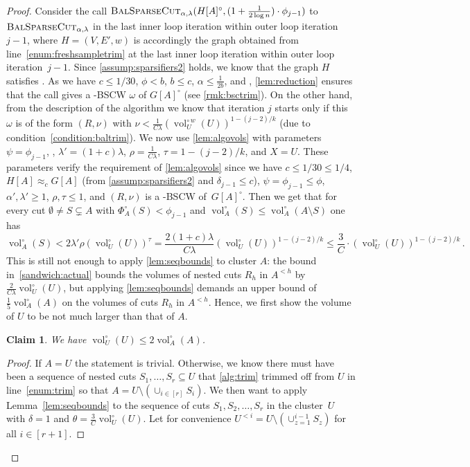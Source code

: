 \documentclass[epsfig,letter,11pt]{article}
\numberwithin{equation}{section}
\newcommand{\unvolc}[2]{\operatorname{vol}_{#2}^\circ (#1)}
\newcommand{\wvolc}[2]{\operatorname{vol}_{#2}^{\circ \,w} (#1)}
\newcommand{\unspc}[2]{\Phi_{#2}^\circ (#1)}
\newcommand{\bsc}{\textsc{BalSparseCut}_{\alpha,\lambda}}
\newtheorem{claim}[theorem]{Claim}
\begin{document}
\begin{proof}
	Consider the call $\bsc(H[A]^\circ, (1+\frac{1}{2\log n}) \cdot \phi_{j-1})$ to $\bsc$ in the last inner loop iteration within outer loop iteration $j-1$, where $H=(V,E',w)$ is accordingly the graph obtained from line~\eqref{enum:freshsampletrim} at the last inner loop iteration within outer loop iteration~${j-1}$. Since \cref{assump:sparsifiers2} holds,  we know that the graph $H$ satisfies . As we have $c \le 1/30$, $\phi < b$, $b \le c$, $\alpha \le \frac{1}{2b}$,  and , \cref{lem:reduction} ensures that the call \smash{$\bsc(H[A]^\circ, (1+\frac{1}{2\log n}) \cdot \phi_{j-1})$} gives a -BSCW $\omega$ of $G[A]^\circ$ (see \cref{rmk:bsctrim}). On the other hand, from the description of the algorithm we know that iteration $j$ starts only if this $\omega$ is of the form $(R,\nu)$ with $\nu < \frac{1}{C \lambda}(\wvolc{U}{U})^{1-(j-2)/k}$ (due to condition~\eqref{condition:baltrim}). We now use \cref{lem:algovols} with parameters $\psi=\phi_{j-1}$, , $\lambda' =(1+c)\lambda$, $\rho = \frac{1}{C\lambda}$, $\tau=1-(j-2)/k$, and $X=U$. These parameters verify the requirement of \cref{lem:algovols} since we have $ c\le 1/30 \le 1/4$, $H[A] \approx_{c} G[A]$ (from \cref{assump:sparsifiers2} and $\delta_{j-1} \le c$), $\psi=\phi_{j-1}\le \phi$, $\alpha',\lambda' \ge 1$, $\rho,\tau \le 1$, and $(R,\nu)$ is a -BSCW of~$G[A]^\circ$. Then we get that for every cut $\emptyset \neq  S \subsetneq A$ with $\unspc{S}{A} < \phi_{j-1}$ and $ \unvolc{S}{A} \le \unvolc{A \setminus S}{A}$ one has
	\begin{equation}
		\label{eq:generalcasenobsc}
		\unvolc{S}{A} < 2\lambda' \rho \left(\unvolc{U}{U}\right)^\tau =  \frac{2(1+c)\lambda}{C\lambda} \left( \unvolc{U}{U}\right)^{1-(j-2)/k} \le \frac{3}{C} \cdot \left(\unvolc{U}{U}\right)^{1-(j-2)/k} \, .
	\end{equation}
	This is still not enough to apply \cref{lem:seqbounds} to cluster $A$: the bound in~\eqref{sandwich:actual} bounds the volumes of nested cuts $R_h$ in $A^{<h}$ by $\frac{2}{C\lambda}\unvolc{U}{U}$, but applying \cref{lem:seqbounds} demands an upper bound of $\frac{1}{5}\unvolc{A}{A}$ on the volumes of cuts $R_h$ in $A^{<h}$. Hence, we first show the volume of $U$ to be not much larger than that of $A$.
	
	\begin{claim}
		\label{claim:voluvola}
		We have $\unvolc{U}{U} \le 2 \unvolc{A}{A}$.
	\end{claim}
	\begin{proof}
		If $A=U$ the statement is trivial. Otherwise, we know there must have been a sequence of nested cuts $S_1,\dots,S_r \subseteq U$ that \cref{alg:trim} trimmed off from $U$ in line~\eqref{enum:trim} so that $A=U \setminus (\cup_{i \in [r]} S_i)$. We then want to apply Lemma~\ref{lem:seqbounds} to the sequence of cuts $S_1,S_2, \dots, S_r$ in the cluster~$U$ with $\delta=1$ and $\theta = \frac{3}{C}\unvolc{U}{U}$. Let for convenience $U^{<i} = U \setminus (\cup_{z =1}^{i-1} S_z)$ for all $i \in [r+1]$.
		

\end{proof}
\end{proof}
\end{document}
